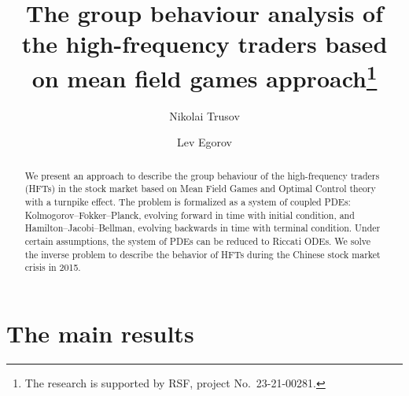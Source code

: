 \documentclass[12pt]{llncs}
\begin{document}
\fi

\title{The group behaviour analysis of the high-frequency traders based on mean field games approach\thanks{The research is supported by RSF, project No.~23-21-00281.}}

\author{Nikolai Trusov   \and  Lev Egorov
}

\maketitle

\begin{abstract}
We present an approach to describe the group behaviour of the high-frequency traders (HFTs) in the stock market based on Mean Field Games and Optimal Control theory with a turnpike effect. The problem is formalized as a system of coupled PDEs: Kolmogorov--Fokker--Planck, evolving forward in time with initial condition, and Hamilton--Jacobi--Bellman, evolving backwards in time with terminal condition. Under certain assumptions, the system of PDEs can be reduced to Riccati ODEs. We solve the inverse problem to describe the behavior of HFTs during the Chinese stock market crisis in 2015.

\end{abstract}


\section{The main results} %
\end{document}

